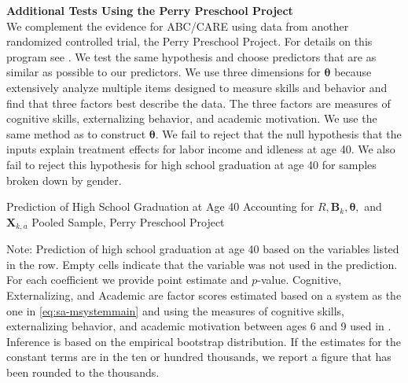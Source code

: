 \noindent\textbf{Additional Tests Using the Perry Preschool Project}\\
\noindent We complement the evidence for ABC/CARE using data from another randomized controlled trial, the Perry Preschool Project. For details on this program see \citet{Heckman_Pinto_etal_2013_PerryFactor}. We test the same hypothesis and choose predictors that are as similar as possible to our predictors. We use three dimensions for $\bm{\theta}$ because \citet{Heckman_Pinto_etal_2013_PerryFactor} extensively analyze multiple items designed to measure skills and behavior and find that three factors best describe the data. The three factors are measures of cognitive skills, externalizing behavior, and academic motivation. We use the same method as \citet{Heckman_Pinto_etal_2013_PerryFactor} to construct $\bm{\theta}$. We fail to reject that the null hypothesis that the inputs explain treatment effects for labor income and idleness at age 40. We also fail to reject this hypothesis for high school graduation at age 40 for samples broken down by gender.

\begin{table}
\begin{threeparttable}
\caption{Prediction of High School Graduation at Age 40 Accounting for $R, \bm{B}_k, \bm{\theta},$ and $\bm{X}_{k,a}$ Pooled Sample, Perry Preschool Project}
\label{table:perry1}
\centering
\scriptsize

\begin{tablenotes}
\footnotesize
\item Note: Prediction of high school graduation at age 40 based on the variables listed in the row. Empty cells indicate that the variable was not used in the prediction. For each coefficient we provide point estimate and $p$-value. Cognitive, Externalizing, and Academic are factor scores estimated based on a system as the one in \eqref{eq:sa-msystemmain} and using the measures of cognitive skills, externalizing behavior, and academic motivation between ages 6 and 9 used in \citet{Heckman_Pinto_etal_2013_PerryFactor}. Inference is based on the empirical bootstrap distribution. If the estimates for the constant terms are in the ten or hundred thousands, we report a figure that has been rounded to the thousands.
\end{tablenotes}
\end{threeparttable}
\end{table}

